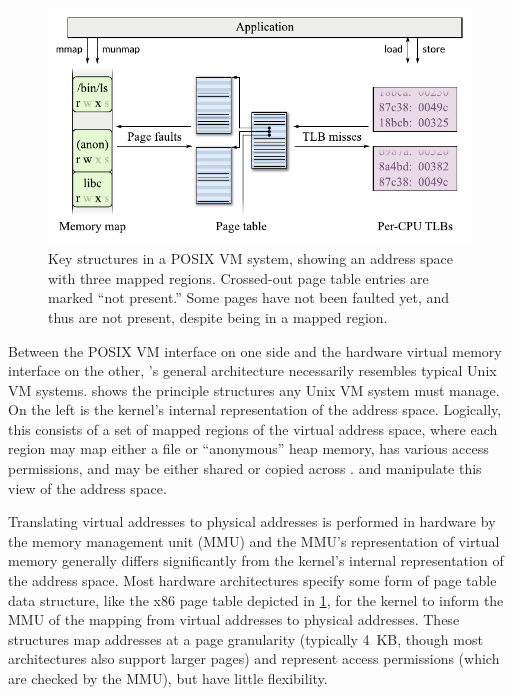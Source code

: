 \begin{figure}
  \centering
  \includegraphics{figures/as.pdf}
  \caption[Key structures in a POSIX VM system.]{Key structures in a
    POSIX VM system, showing an address space with three mapped
    regions.  Crossed-out page table entries are marked ``not
    present.''  Some pages have not been faulted yet, and thus are not
    present, despite being in a mapped region.}
  \label{fig:vm-structures}
\end{figure}

Between the POSIX VM interface on one side and the hardware virtual
memory interface on the other, \vm's general architecture necessarily
resembles typical Unix VM systems.   shows the
principle structures any Unix VM system must manage.  On the left is
the kernel's internal representation of the address space.  Logically,
this consists of a set of mapped regions of the virtual address space,
where each region may map either a file or ``anonymous'' heap
memory, has various access permissions, and may be either shared or
copied across .   and 
manipulate this view of the address space.

Translating virtual addresses to physical addresses is
performed in hardware by the memory
management unit (MMU) and the MMU's representation of virtual memory
generally differs significantly from the kernel's internal
representation of the address space.  Most hardware architectures
specify some form of page table data structure, like the x86 page
table depicted in
\cref{fig:vm-structures}, for the kernel to inform the MMU of the
mapping from virtual addresses to physical addresses.  These
structures map addresses at a page granularity (typically 4~KB, though
most architectures also support larger pages) and represent access
permissions (which are checked by the MMU), but have little
flexibility.

